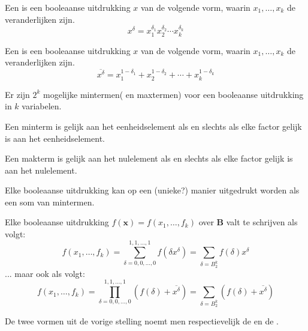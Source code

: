 \documentclass[main.tex]{subfiles}
\begin{document}
\begin{de}
  Een  is een booleaanse uitdrukking $x$ van de volgende vorm, waarin $x_{1},\dotsc,x_{k}$ de veranderlijken zijn.
  \[ x^{\delta} = x_{1}^{\delta_{1}}x_{2}^{\delta_{2}}\dotsb x_{k}^{\delta_{k}} \]
\end{de}

\begin{de}
  Een  is een booleaanse uitdrukking $x$ van de volgende vorm, waarin $x_{1},\dotsc,x_{k}$ de veranderlijken zijn.
  \[ \overline{x^{\delta}} = x_{1}^{1-\delta_{1}}+x_{2}^{1-\delta_{2}}+\dotsb+ x_{k}^{1-\delta_{k}} \]
\end{de}

\begin{opm}
  Er zijn $2^{k}$ mogelijke mintermen( en maxtermen) voor een booleaanse uitdrukking in $k$ variabelen.
\end{opm}

\begin{ei}
  Een minterm is gelijk aan het eenheidselement als en slechts als elke factor gelijk is aan het eenheidselement.
\end{ei}

\begin{ei}
  Een makterm is gelijk aan het nulelement als en slechts als elke factor gelijk is aan het nulelement.
\end{ei}

\begin{st}
  Elke booleaanse uitdrukking kan op een (unieke?) manier uitgedrukt worden als een som van mintermen.
\end{st}

\begin{st}
  Elke booleaanse uitdrukking $f(\mathbf{x}) = f(x_{1},\dotsc,f_{k})$ over $\mathbf{B}$ valt te schrijven als volgt:
  \[ f(x_{1},\dotsc,f_{k}) = \sum_{\delta = 0,0,\dotsc,0}^{1,1,\dotsc,1}f(\delta x^{\delta}) = \sum_{\delta = B_{2}^{k}}f(\delta)x^{\delta} \]
  ... maar ook als volgt:
  \[ f(x_{1},\dotsc,f_{k}) = \prod_{\delta = 0,0,\dotsc,0}^{1,1,\dotsc,1}(f(\delta) + \overline{x^{\delta}}) = \sum_{\delta = B_{2}^{k}}(f(\delta) + \overline{x^{\delta}}) \]
\end{st}

\begin{de}
  De twee vormen uit de vorige stelling noemt men respectievelijk de  en de .
\end{de}
\end{document}
